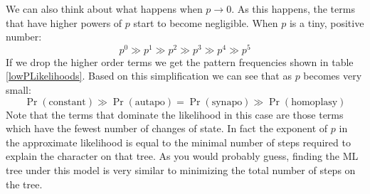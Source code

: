 \documentclass[11pt]{article}
\begin{document}
We can also think about what happens when $p\rightarrow 0$.  
As this happens, the terms that have higher powers of $p$ start to become negligible. When $p$ is a tiny, positive number:
\[ p^0\gg p^1 \gg p^2 \gg p^3 \gg p^4 \gg p^5 \]
If we drop the higher order terms we get the pattern frequencies shown in table \ref{lowPLikelihoods}.
Based on this simplification we can see that as $p$ becomes very small:
\[ \Pr(\mbox{constant}) \gg \Pr(\mbox{autapo}) = \Pr(\mbox{synapo}) \gg \Pr(\mbox{homoplasy})\]
Note that the terms that dominate the likelihood in this case are those terms
which have the fewest number of changes of state.
In fact the exponent of $p$ in the approximate likelihood is equal to the minimal number of steps
required to explain the character on that tree.
As you would probably guess, finding the ML tree under this model is very similar to
minimizing the total number of steps on the tree.
\end{document}
